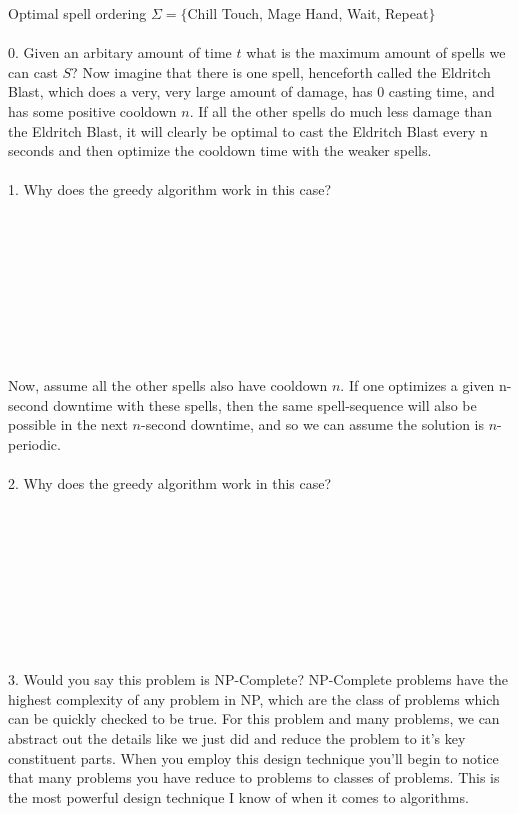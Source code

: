 \documentclass[12pt]{article}
\begin{document}
Optimal spell ordering $\Sigma =\{$Chill Touch, Mage Hand, Wait, Repeat$\}$\\\\
0. Given an arbitary amount of time $t$ what is the maximum amount of spells
we can cast $S$?
\newpage
\noindent Now imagine that there is one spell, henceforth called the Eldritch Blast, 
which does a very, very large amount of damage, has $0$ casting time, and has 
some positive cooldown $n$. If all the other spells do much less damage than the 
Eldritch Blast, it will clearly be optimal to cast the Eldritch Blast every n seconds and 
then optimize the cooldown time with the weaker spells.\\\\
1. Why does the greedy algorithm work in this case?\\\\\\\\\\\\\\\\\\\\
Now, assume all the other spells also have cooldown $n$. 
If one optimizes a given n-second downtime with these spells, 
then the same spell-sequence will also be possible in the next 
$n$-second downtime, and so we can assume the solution is $n$-periodic.\\\\
2. Why does the greedy algorithm work in this case?\\\\\\\\\\\\\\\\\\\\
3. Would you say this problem is NP-Complete? NP-Complete problems have the 
highest complexity of any problem in NP, which are the class of problems which can
be quickly checked to be true.
\newpage
\noindent For this problem and many problems, we can abstract out the details like we just did
and reduce the problem to it's key constituent parts. When you employ this
design technique you'll begin to notice that many problems you have reduce to problems
to classes of problems. This is the most powerful design technique I know of when it 
comes to algorithms.\\\\
\end{document}
